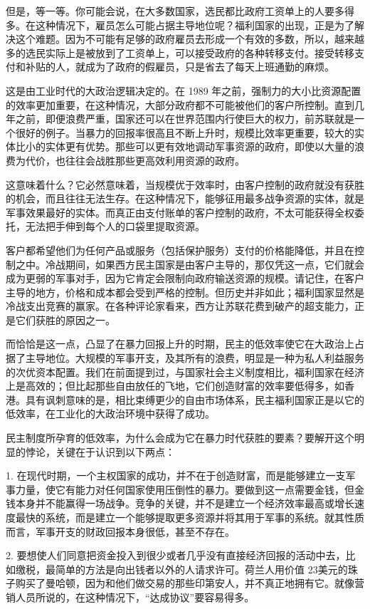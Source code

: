 但是，等一等。你可能会说，在大多数国家，选民都比政府工资单上的人要多得多。在这种情况下，雇员怎么可能占据主导地位呢？福利国家的出现，正是为了解决这个难题。因为不可能有足够的政府雇员去形成一个有效的多数，所以，越来越多的选民实际上是被放到了工资单上，可以接受政府的各种转移支付。接受转移支付和补贴的人，就成为了政府的假雇员，只是省去了每天上班通勤的麻烦。

这是由工业时代的大政治逻辑决定的。在 1989 年之前，强制力的大小比资源配置的效率更加重要，在这种情况，大部分政府都不可能被他们的客户所控制。直到几年之前，即便浪费严重，国家还可以在世界范围内行使巨大的权力，前苏联就是一个很好的例子。当暴力的回报率很高且不断上升时，规模比效率更重要，较大的实体比小的实体更有优势。那些可以更有效地调动军事资源的政府，即使以大量的浪费为代价，也往往会战胜那些更高效利用资源的政府。

这意味着什么？它必然意味着，当规模优于效率时，由客户控制的政府就没有获胜的机会，而且往往无法生存。在这种情况下，能够征用最多战争资源的实体，就是军事效果最好的实体。而真正由支付账单的客户控制的政府，不太可能获得全权委托，无法把手伸到每个人的口袋里提取资源。

客户都希望他们为任何产品或服务（包括保护服务）支付的价格能降低，并且在控制之中。冷战期间，如果西方民主国家是由客户主导的，那仅凭这一点，它们就会成为更弱的军事对手，因为它肯定会限制向政府输送资源的规模。请记住，在客户主导的地方，价格和成本都会受到严格的控制。但历史并非如此；福利国家显然是冷战支出竞赛的赢家。在各种评论家看来，西方让苏联花费到破产的超支能力，正是它们获胜的原因之一。

而恰恰是这一点，凸显了在暴力回报上升的时期，民主的低效率使它在大政治上占据了主导地位。大规模的军事开支，及其所有的浪费，明显是一种为私人利益服务的次优资本配置。我们在前面提到过，与国家社会主义制度相比，福利国家在经济上是高效的；但比起那些自由放任的飞地，它们创造财富的效率要低得多，如香港。具有讽刺意味的是，相比束缚更少的自由市场体系，民主福利国家正是以它的低效率，在工业化的大政治环境中获得了成功。

民主制度所孕育的低效率，为什么会成为它在暴力时代获胜的要素？要解开这个明显的悖论，关键在于认识到以下两点：

1. 在现代时期，一个主权国家的成功，并不在于创造财富，而是能够建立一支军事力量，使它有能力对任何国家使用压倒性的暴力。要做到这一点需要金钱，但金钱本身并不能赢得一场战争。竞争的关键，并不是建立一个经济效率最高或增长速度最快的系统，而是建立一个能够提取更多资源并将其用于军事的系统。就其性质而言，军事开支的财政回报本身很低，甚至不存在。

2. 要想使人们同意把资金投入到很少或者几乎没有直接经济回报的活动中去，比如缴税，最简单的方法是向出钱者以外的人请求许可。荷兰人用价值 23美元的珠子购买了曼哈顿，因为和他们做交易的那些印第安人，并不真正地拥有它。就像营销人员所说的，在这种情况下，“达成协议”要容易得多。

